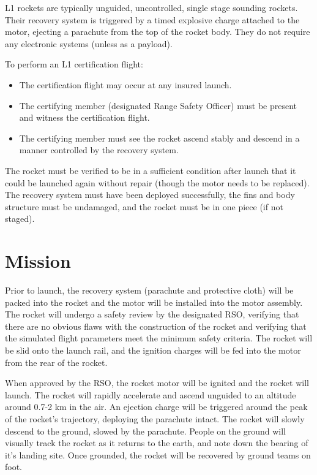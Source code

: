 \documentclass{article}
\begin{document}
L1 rockets are typically unguided, uncontrolled, single stage sounding rockets. Their recovery system is triggered by a timed explosive charge attached to the motor, ejecting a parachute from the top of the rocket body. They do not require any electronic systems (unless as a payload).

To perform an L1 certification flight:
\begin{itemize}
    \item The certification flight may occur at any insured launch.
    \item The certifying member (designated Range Safety Officer) must be present and witness the certification flight.
    \item The certifying member must see the rocket ascend stably and descend in a manner controlled by the recovery system.
\end{itemize}

The rocket must be verified to be in a sufficient condition after launch that it could be launched again without repair (though the motor needs to be replaced). The recovery system must have been deployed successfully, the fins and body structure must be undamaged, and the rocket must be in one piece (if not staged).

\section{Mission}

Prior to launch, the recovery system (parachute and protective cloth) will be packed into the rocket and the motor will be installed into the motor assembly. The rocket will undergo a safety review by the designated RSO, verifying that there are no obvious flaws with the construction of the rocket and verifying that the simulated flight parameters meet the minimum safety criteria. The rocket will be slid onto the launch rail, and the ignition charges will be fed into the motor from the rear of the rocket.

When approved by the RSO, the rocket motor will be ignited and the rocket will launch. The rocket will rapidly accelerate and ascend unguided to an altitude around 0.7-2 km in the air. An ejection charge will be triggered around the peak of the rocket's trajectory, deploying the parachute intact. The rocket will slowly descend to the ground, slowed by the parachute. People on the ground will visually track the rocket as it returns to the earth, and note down the bearing of it's landing site. Once grounded, the rocket will be recovered by ground teams on foot.
\end{document}
